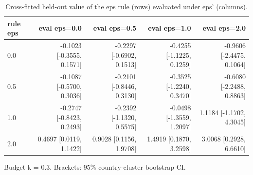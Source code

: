 \begin{table}[htbp]
\centering
\caption{Cross-fitted held-out value of the eps rule (rows) evaluated under eps' (columns).}
\label{tab:policy_matrix}
\begin{tabular}{lrrrr}
\toprule
rule eps & eval eps=0.0 & eval eps=0.5 & eval eps=1.0 & eval eps=2.0 \\
\midrule
0.0 & -0.1023 [-0.3555, 0.1571] & -0.2297 [-0.6902, 0.1513] & -0.4255 [-1.1225, 0.1259] & -0.9606 [-2.4475, 0.1064] \\
0.5 & -0.1087 [-0.5700, 0.3036] & -0.2101 [-0.8446, 0.3130] & -0.3525 [-1.2240, 0.3470] & -0.6080 [-2.2488, 0.8863] \\
1.0 & -0.2747 [-0.8423, 0.2493] & -0.2392 [-1.1320, 0.5575] & -0.0498 [-1.3559, 1.2097] & 1.1184 [-1.1702, 4.3045] \\
2.0 & 0.4697 [0.0119, 1.1422] & 0.9028 [0.1156, 1.9708] & 1.4919 [0.1870, 3.2598] & 3.0068 [0.2928, 6.6610] \\
\bottomrule
\end{tabular}
\par\smallskip\footnotesize Budget k = 0.3. Brackets: 95\% country-cluster bootstrap CI.
\end{table}
